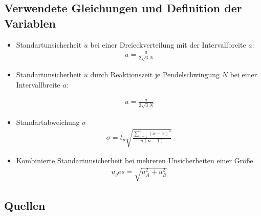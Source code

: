 
\subsection{Verwendete Gleichungen und Definition der Variablen}\label{VGuD}
\begin{itemize}
\item Standartunsicherheit $u$ bei einer Dreieckverteilung mit der Intervallbreite $a$:
\begin{align}
	u=\frac{a}{2\sqrt{6}N} \label{su3}
\end{align} 

\item Standartunsicherheit $u$ durch Reaktionszeit je Pendelschwingung $N$ bei einer Intervallbreite $a$:

\begin{align}
	u=\frac{a}{2\sqrt{3}N} \label{sur}
\end{align} 


\item Standartabweichung $\sigma$
\begin{align}
\sigma=t_p \sqrt{\frac{\sum_{i=1}^{n}(x-\bar{x})^2}{n(n-1)}}
\label{sigma}
\end{align}

\item Kombinierte Standartunsicherheit bei mehreren Unsicherheiten einer Größe
\begin{align}
u_ges=\sqrt{u_A^2+u_B^2}
\label{kombsu}
\end{align}

\end{itemize}


\subsection{Quellen}
